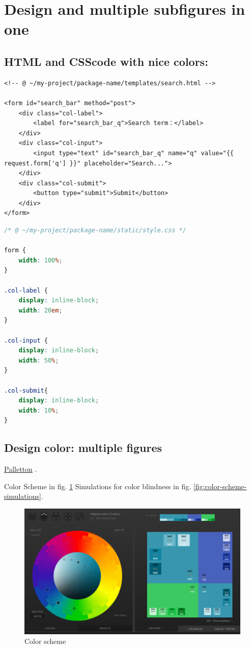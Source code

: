 \section{Design and multiple subfigures in one}\label{dev-css}

\subsection{HTML and CSScode with nice colors:}

\begin{lstlisting}[language=HTML5, title={small Language: HTML}]
<!-- @ ~/my-project/package-name/templates/search.html -->

<form id="search_bar" method="post">
    <div class="col-label">
        <label for="search_bar_q">Search term：</label>
    </div>
    <div class="col-input">
        <input type="text" id="search_bar_q" name="q" value="{{ request.form['q'] }}" placeholder="Search...">
    </div>
    <div class="col-submit">
        <button type="submit">Submit</button>
    </div>
</form>
\end{lstlisting}

\begin{lstlisting}[language=CSS, title={small Language: CSS}]
/* @ ~/my-project/package-name/static/style.css */

form {
    width: 100%;
}

.col-label {
    display: inline-block;
    width: 20em;
}

.col-input {
    display: inline-block;
    width: 50%;
}

.col-submit{
    display: inline-block;
    width: 10%;
}
\end{lstlisting}

\subsection{Design color: multiple figures}

\href{https://paletton.com}{Palletton} \cite[][]{paletton}.

Color Scheme in fig. \ref{fig:color-scheme} Simulations for color blindness in fig. \ref{fig:color-scheme-simulations}.

\begin{figure}[bh]
\centering
\includegraphics[width=0.8\linewidth]{figures/color-scheme.png}
\caption{Color scheme}
\label{fig:color-scheme}
\end{figure}

